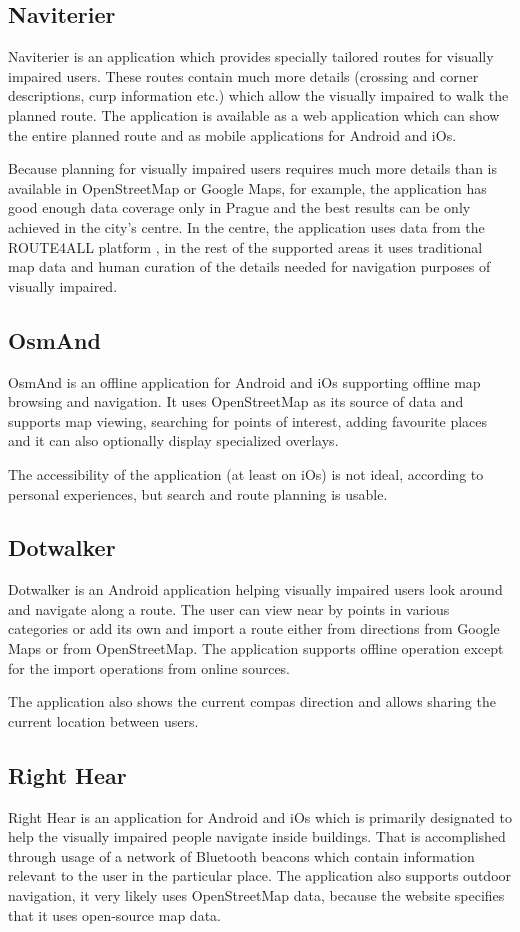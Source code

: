 \documentclass[nolof,digital]{fithesis3}
\begin{document}
\subsection{Naviterier}
Naviterier \parencite{naviterier} is an application which provides specially tailored routes for visually impaired users. These routes contain much more details (crossing and corner descriptions, curp information etc.) which allow the visually impaired to walk the planned route. The application is available as a web application which can show the entire planned route and as mobile applications for Android and iOs.

Because planning for visually impaired users requires much more details than is available in OpenStreetMap or Google Maps, for example, the application has good enough data coverage only in Prague and the best results can be only achieved in the city's centre. In the centre, the application uses data from the ROUTE4ALL platform \parencite{route4all}, in the rest of the supported areas it uses traditional map data and human curation of the details needed for navigation purposes of visually impaired.
\subsection{OsmAnd}
OsmAnd \parencite{osmand} is an offline application for Android and iOs supporting offline map browsing and navigation. It uses OpenStreetMap as its source of data and supports map viewing, searching for points of interest, adding favourite places and it can also optionally display specialized overlays.

The accessibility of the application (at least on iOs) is not ideal, according to personal experiences, but search and route planning is usable.
\subsection{Dotwalker}
Dotwalker \parencite{dotwalker} is an Android application helping visually impaired users look around and navigate along a route. The user can view near by points in various categories or add its own and import a route either from directions from Google Maps or from OpenStreetMap. The application supports offline operation except for the import operations from online sources.

The application also shows the current compas direction and allows sharing the current location between users.
\subsection{Right Hear}
Right Hear \parencite{righthear} is an application for Android and iOs which is primarily designated to help the visually impaired people navigate inside buildings. That is accomplished through usage of a network of Bluetooth beacons which contain information relevant to the user in the particular place. The application also supports outdoor navigation, it very likely uses OpenStreetMap data, because the website specifies that it uses open-source map data.
\end{document}
